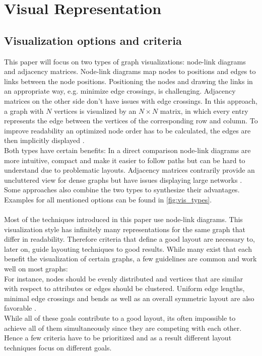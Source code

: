 \section{Visual Representation}
\subsection{Visualization options and criteria}
This paper will focus on two types of graph visualizations: node-link diagrams and adjacency matrices.
Node-link diagrams map nodes to positions and edges to links between the node positions. Positioning the nodes and drawing the links in an appropriate way, e.g. minimize edge crossings, is challenging. Adjacency matrices on the other side don't have issues with edge crossings. In this approach, a graph with $N$ vertices is visualized by an $N \times N $ matrix, in which every entry represents the edge between the vertices of the corresponding row and column. To improve readability an optimized node order has to be calculated, the edges are then implicitly displayed \cite{VonLandesberger2011}.\\
Both types have certain benefits: In a direct comparison node-link diagrams are more intuitive, compact and make it easier to follow paths but can be hard to understand due to problematic layouts. Adjacency matrices contrarily provide an uncluttered view for dense graphs but have issues displaying large networks \cite{Ghoniem2004}. Some approaches also combine the two types to synthesize their advantages. Examples for all mentioned options can be found in \autoref{fig:vis_types}.
\\\\
Most of the techniques introduced in this paper use node-link diagrams. This visualization style has infinitely many representations for the same graph that differ in readability. Therefore criteria that define a good layout are necessary to, later on, guide layouting techniques to good results. While many exist that each benefit the visualization of certain graphs, a few guidelines are common and work well on most graphs: \\
For instance, nodes should be evenly distributed and vertices that are similar with respect to attributes or edges should be clustered. Uniform edge lengths, minimal edge crossings and bends as well as an overall symmetric layout are also favorable \cite{Bennett2007}. \\
While all of these goals contribute to a good layout, its often impossible to achieve all of them simultaneously since they are competing with each other\cite{Gibson2013}. Hence a few criteria have to be prioritized and as a result different layout techniques focus on different goals.
